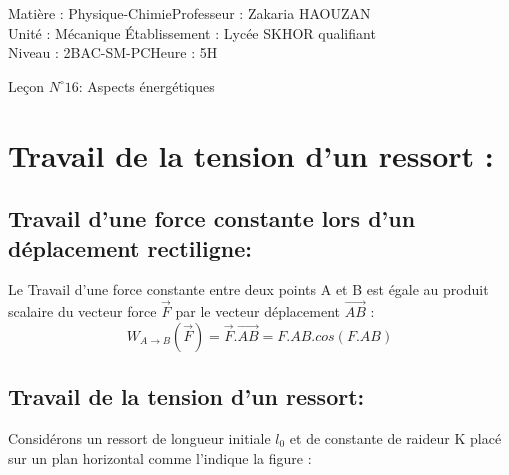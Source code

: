 \documentclass[12pt]{article}
\author{Zakaria HAOUZAN}
\date{\today}
\newcommand\headerMe[2]{\noindent{}#1\hfill#2}
\begin{document}
\headerMe{Matière : Physique-Chimie}{Professeur : Zakaria HAOUZAN}\\
\headerMe{Unité : Mécanique }{Établissement : Lycée SKHOR qualifiant}\\
\headerMe{Niveau : 2BAC-SM-PC}{Heure : 5H}\\

\begin{center}

    \Large{Leçon $N^{\circ} 16 $: \color{red}Aspects énergétiques}
\end{center}


\section{Travail de la tension d'un ressort : }
\subsection{Travail d'une force constante lors d'un déplacement rectiligne:}



Le Travail d'une force constante entre deux points A et B est égale au produit scalaire du vecteur force $\vec{F}$ par le vecteur déplacement $\vec{AB}$ : $$W_{A\rightarrow B}(\vec{F}) = \vec{F}.\vec{AB} =F.AB.cos(F.AB)$$

\subsection{Travail de la tension d'un ressort:}
Considérons un ressort de longueur initiale $l_0$ et de constante de raideur K placé sur un plan horizontal comme l'indique la figure : 
\end{document}
